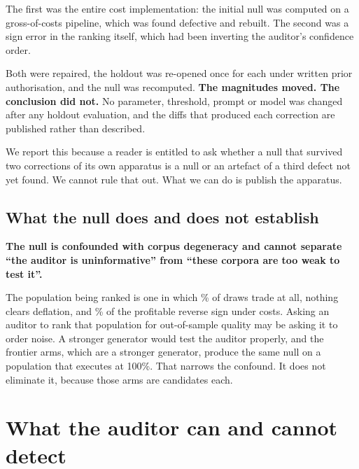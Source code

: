 \documentclass[11pt,a4paper]{article}
\begin{document}
\begin{selfreport}[title={We found two defects in our own pipeline after first computing this null}]
The first was the entire cost implementation: the initial null was computed on a gross-of-costs
pipeline, which was found defective and rebuilt. The second was a sign error in the ranking
itself, which had been inverting the auditor's confidence order.

Both were repaired, the holdout was re-opened once for each under written prior authorisation, and
the null was recomputed. \textbf{The magnitudes moved. The conclusion did not.} No parameter,
threshold, prompt or model was changed after any holdout evaluation, and the diffs that produced
each correction are published rather than described.

We report this because a reader is entitled to ask whether a null that survived two corrections of
its own apparatus is a null or an artefact of a third defect not yet found. We cannot rule that
out. What we can do is publish the apparatus.
\end{selfreport}

\subsection{What the null does and does not establish}

\begin{scopebox}
\textbf{The null is confounded with corpus degeneracy and cannot separate ``the auditor is
uninformative'' from ``these corpora are too weak to test it''.}

The population being ranked is one in which \pgmLocalTrade\% of draws trade at all, nothing clears
deflation, and \aaLocalFlipsPct\% of the profitable reverse sign under costs. Asking an auditor to
rank that population for out-of-sample quality may be asking it to order noise. A stronger
generator would test the auditor properly, and the frontier arms, which are a stronger
generator, produce the same null on a population that executes at 100\%. That narrows the
confound. It does not eliminate it, because those arms are \aaGvNLarge{} candidates each.
\end{scopebox}

\section{What the auditor can and cannot detect}
\label{sec:limits-auditor}
\end{document}
